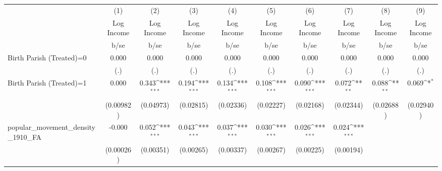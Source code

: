 {
\def\sym#1{\ifmmode^{#1}\else\(^{#1}\)\fi}
\begin{tabular}{l*{9}{c}}
\hline\hline
                    &\multicolumn{1}{c}{(1)}&\multicolumn{1}{c}{(2)}&\multicolumn{1}{c}{(3)}&\multicolumn{1}{c}{(4)}&\multicolumn{1}{c}{(5)}&\multicolumn{1}{c}{(6)}&\multicolumn{1}{c}{(7)}&\multicolumn{1}{c}{(8)}&\multicolumn{1}{c}{(9)}\\
                    &\multicolumn{1}{c}{Log Income}&\multicolumn{1}{c}{Log Income}&\multicolumn{1}{c}{Log Income}&\multicolumn{1}{c}{Log Income}&\multicolumn{1}{c}{Log Income}&\multicolumn{1}{c}{Log Income}&\multicolumn{1}{c}{Log Income}&\multicolumn{1}{c}{Log Income}&\multicolumn{1}{c}{Log Income}\\
                    &        b/se         &        b/se         &        b/se         &        b/se         &        b/se         &        b/se         &        b/se         &        b/se         &        b/se         \\
\hline
Birth Parish (Treated)=0&       0.000         &       0.000         &       0.000         &       0.000         &       0.000         &       0.000         &       0.000         &       0.000         &       0.000         \\
                    &         (.)         &         (.)         &         (.)         &         (.)         &         (.)         &         (.)         &         (.)         &         (.)         &         (.)         \\
Birth Parish (Treated)=1&       0.000         &       0.343\sym{***}&       0.194\sym{***}&       0.134\sym{***}&       0.108\sym{***}&       0.090\sym{***}&       0.072\sym{**} &       0.088\sym{**} &       0.069\sym{*}  \\
                    &   (0.00982)         &   (0.04973)         &   (0.02815)         &   (0.02336)         &   (0.02227)         &   (0.02168)         &   (0.02344)         &   (0.02688)         &   (0.02940)         \\
popular\_movement\_density\_1910\_FA&      -0.000         &       0.052\sym{***}&       0.043\sym{***}&       0.037\sym{***}&       0.030\sym{***}&       0.026\sym{***}&       0.024\sym{***}&                     &                     \\
                    &   (0.00026)         &   (0.00351)         &   (0.00265)         &   (0.00337)         &   (0.00267)         &   (0.00225)         &   (0.00194)         &                     &                     \\

\end{tabular}}
